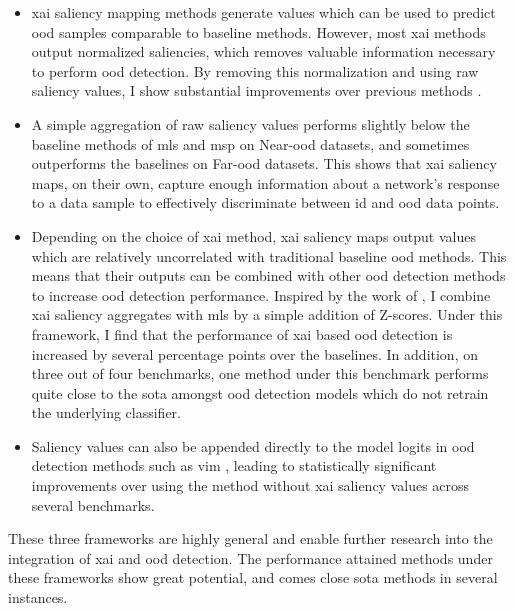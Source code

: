 \documentclass[UKenglish]{uiomasterthesis} %
\theoremstyle{definition}
\begin{document}
\begin{itemize}
    \item \ac{xai} saliency mapping methods generate values which can be used to predict \ac{ood} samples comparable to baseline methods. However, most \ac{xai} methods output normalized saliencies, which removes valuable information necessary to perform \ac{ood} detection. By removing this normalization and using raw saliency values, I show substantial improvements over previous methods \cite{martinez}.
    \item A simple aggregation of raw saliency values performs slightly below the baseline methods of \ac{mls} and \ac{msp} on Near-\ac{ood} datasets, and sometimes outperforms the baselines on Far-\ac{ood} datasets. This shows that \ac{xai} saliency maps, on their own, capture enough information about a network's response to a data sample to effectively discriminate between \ac{id} and \ac{ood} data points.%
    \item Depending on the choice of \ac{xai} method, \ac{xai} saliency maps output values which are relatively uncorrelated with traditional baseline \ac{ood} methods. This means that their outputs can be combined with other \ac{ood} detection methods to increase \ac{ood} detection performance. Inspired by the work of \cite{combood}, I combine \ac{xai} saliency aggregates with \ac{mls} by a simple addition of Z-scores. Under this framework, I find that the performance of \ac{xai} based \ac{ood} detection is increased by several percentage points over the baselines. In addition, on three out of four benchmarks, one method under this benchmark performs quite close to the \ac{sota} amongst \ac{ood} detection models which do not retrain the underlying classifier.
    \item Saliency values can also be appended directly to the model logits in \ac{ood} detection methods such as \ac{vim} \cite{vim}, leading to statistically significant improvements over using the method without \ac{xai} saliency values across several benchmarks.
\end{itemize}

These three frameworks are highly general and enable further research into the integration of \ac{xai} and \ac{ood} detection. The performance attained methods under these frameworks show great potential, and comes close \ac{sota} methods in several instances.
\end{document}
